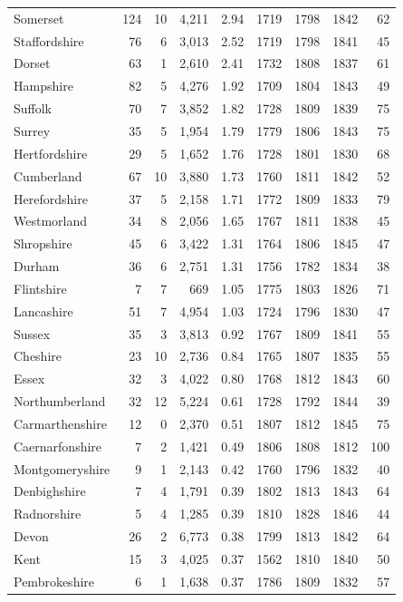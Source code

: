 \documentclass[11pt,a4paper]{article}
\begin{document}
{\begin{longtable}{lrrrrrrrr}
Somerset & 124 & 10 & 4,211 & 2.94 & 1719 & 1798 & 1842 & 62\\
Staffordshire & 76 & 6 & 3,013 & 2.52 & 1719 & 1798 & 1841 & 45\\
Dorset & 63 & 1 & 2,610 & 2.41 & 1732 & 1808 & 1837 & 61\\
Hampshire & 82 & 5 & 4,276 & 1.92 & 1709 & 1804 & 1843 & 49\\
Suffolk & 70 & 7 & 3,852 & 1.82 & 1728 & 1809 & 1839 & 75\\
Surrey & 35 & 5 & 1,954 & 1.79 & 1779 & 1806 & 1843 & 75\\
Hertfordshire & 29 & 5 & 1,652 & 1.76 & 1728 & 1801 & 1830 & 68\\
Cumberland & 67 & 10 & 3,880 & 1.73 & 1760 & 1811 & 1842 & 52\\
Herefordshire & 37 & 5 & 2,158 & 1.71 & 1772 & 1809 & 1833 & 79\\
Westmorland & 34 & 8 & 2,056 & 1.65 & 1767 & 1811 & 1838 & 45\\
Shropshire & 45 & 6 & 3,422 & 1.31 & 1764 & 1806 & 1845 & 47\\
Durham & 36 & 6 & 2,751 & 1.31 & 1756 & 1782 & 1834 & 38\\
Flintshire & 7 & 7 & 669 & 1.05 & 1775 & 1803 & 1826 & 71\\
Lancashire & 51 & 7 & 4,954 & 1.03 & 1724 & 1796 & 1830 & 47\\
Sussex & 35 & 3 & 3,813 & 0.92 & 1767 & 1809 & 1841 & 55\\
Cheshire & 23 & 10 & 2,736 & 0.84 & 1765 & 1807 & 1835 & 55\\
Essex & 32 & 3 & 4,022 & 0.80 & 1768 & 1812 & 1843 & 60\\
Northumberland & 32 & 12 & 5,224 & 0.61 & 1728 & 1792 & 1844 & 39\\
Carmarthenshire & 12 & 0 & 2,370 & 0.51 & 1807 & 1812 & 1845 & 75\\
Caernarfonshire & 7 & 2 & 1,421 & 0.49 & 1806 & 1808 & 1812 & 100\\
Montgomeryshire & 9 & 1 & 2,143 & 0.42 & 1760 & 1796 & 1832 & 40\\
Denbighshire & 7 & 4 & 1,791 & 0.39 & 1802 & 1813 & 1843 & 64\\
Radnorshire & 5 & 4 & 1,285 & 0.39 & 1810 & 1828 & 1846 & 44\\
Devon & 26 & 2 & 6,773 & 0.38 & 1799 & 1813 & 1842 & 64\\
Kent & 15 & 3 & 4,025 & 0.37 & 1562 & 1810 & 1840 & 50\\
Pembrokeshire & 6 & 1 & 1,638 & 0.37 & 1786 & 1809 & 1832 & 57\\

\end{longtable}}
\end{document}

